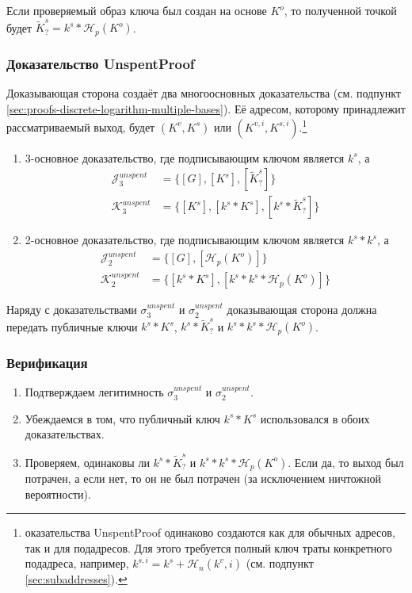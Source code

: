 Если проверяемый образ ключа был создан на основе $K^o$, то полученной точкой будет $\tilde{K}^s_? = k^s*\mathcal{H}_p(K^o)$.

\subsubsection*{Доказательство UnspentProof}

Доказывающая сторона создаёт два многоосновных доказательства (см. подпункт \ref{sec:proofs-discrete-logarithm-multiple-bases}). Её адресом, которому принадлежит рассматриваемый выход, будет $(K^v, K^s)$ или $(K^{v,i}, K^{s,i})$.\footnote{оказательства UnspentProof одинаково создаются как для обычных адресов, так и для подадресов. Для этого требуется полный ключ траты конкретного подадреса, например, $k^{s,i} = k^s + \mathcal{H}_n(k^v,i)$ (см. подпункт \ref{sec:subaddresses}).}

\begin{enumerate}
    \item 3-основное доказательство, где подписывающим ключом является $k^s$, а\vspace{.175cm}
    \begin{align*}
        \mathcal{J}^{unspent}_3 &= \{[G], [K^s], [\tilde{K}^s_?]\}\\
        \mathcal{K}^{unspent}_3 &= \{[K^s], [k^s*K^s], [k^s*\tilde{K}^s_?]\}
    \end{align*}{}
    \item 2-основное доказательство, где подписывающим ключом является $k^s*k^s$, а\vspace{.175cm}
    \begin{align*}
        \mathcal{J}^{unspent}_2 &= \{[G], [\mathcal{H}_p(K^o)]\}\\
        \mathcal{K}^{unspent}_2 &= \{[k^s*K^s], [k^s*k^s*\mathcal{H}_p(K^o)]\}
    \end{align*}{}
\end{enumerate}{}

Наряду с доказательствами $\sigma^{unspent}_3$ и $\sigma^{unspent}_2$ доказывающая сторона должна передать пуб\-личные ключи $k^s*K^s$, $k^s*\tilde{K}^s_?$ и $k^s*k^s*\mathcal{H}_p(K^o)$.

\subsubsection*{Верификация}

\begin{enumerate}
    \item Подтверждаем легитимность $\sigma^{unspent}_3$ и $\sigma^{unspent}_2$.
    \item Убеждаемся в том, что публичный ключ $k^s*K^s$ использовался в обоих доказательствах.
    \item Проверяем, одинаковы ли $k^s*\tilde{K}^s_?$ и $k^s*k^s*\mathcal{H}_p(K^o)$. Если да, то выход был потрачен, а если нет, то он не был потрачен (за исключением ничтожной вероятности).
\end{enumerate}{}

